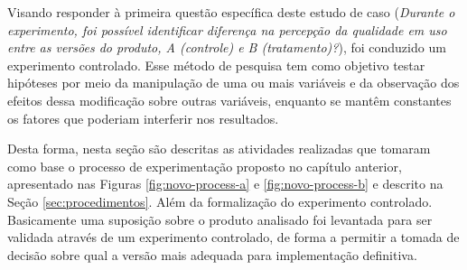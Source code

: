 Visando responder à primeira questão específica deste estudo de caso (\textit{Durante o experimento, foi possível identificar diferença na percepção da qualidade em uso entre as versões do produto, A (controle) e B (tratamento)?}), foi conduzido um experimento controlado. Esse método de pesquisa tem como objetivo testar hipóteses por meio da manipulação de uma ou mais variáveis e da observação dos efeitos dessa modificação sobre outras variáveis, enquanto se mantêm constantes os fatores que poderiam interferir nos resultados.

Desta forma, nesta seção são descritas as atividades realizadas que tomaram como base o processo de experimentação proposto no capítulo anterior, apresentado nas Figuras \ref{fig:novo-process-a} e \ref{fig:novo-process-b} e descrito na Seção \ref{sec:procedimentos}. Além da formalização do experimento controlado. Basicamente uma suposição sobre o produto analisado foi levantada para ser validada através de um experimento controlado, de forma a permitir a tomada de decisão sobre qual a versão mais adequada para implementação definitiva.









% 



